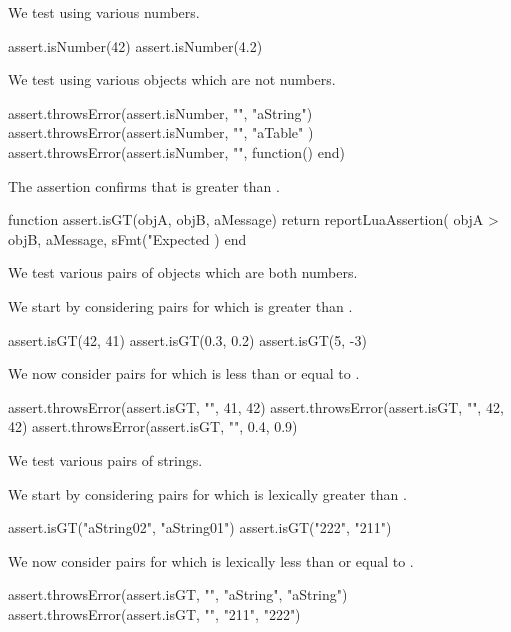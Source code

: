 
We test using various numbers.

\startLuaTest
  assert.isNumber(42)
  assert.isNumber(4.2)
\stopLuaTest
\stopTestCase


We test using various objects which are not numbers. 

\startLuaTest
  assert.throwsError(assert.isNumber, "", "aString")
  assert.throwsError(assert.isNumber, "", { "aTable" })
  assert.throwsError(assert.isNumber, "", function() end)
\stopLuaTest
\stopTestCase

\stopTestSuite


The  assertion confirms that  is greater than 
. 

\startLuaCode
function assert.isGT(objA, objB, aMessage)
  return reportLuaAssertion(
    objA > objB,
    aMessage,
    sFmt("Expected %
  )
end
\stopLuaCode


We test various pairs of objects which are both numbers.

We start by considering pairs for which  is greater than 
. 

\startLuaTest
  assert.isGT(42, 41)
  assert.isGT(0.3, 0.2)
  assert.isGT(5, -3)
\stopLuaTest

We now consider pairs for which  is less than or equal to 
. 

\startLuaTest
  assert.throwsError(assert.isGT, "", 41, 42)
  assert.throwsError(assert.isGT, "", 42, 42)
  assert.throwsError(assert.isGT, "", 0.4, 0.9)
\stopLuaTest
\stopTestCase


We test various pairs of strings.

We start by considering pairs for which  is lexically greater 
than . 

\startLuaTest
  assert.isGT("aString02", "aString01")
  assert.isGT("222", "211")
\stopLuaTest

We now consider pairs for which  is lexically less than or 
equal to . 

\startLuaTest
  assert.throwsError(assert.isGT, "", "aString", "aString")
  assert.throwsError(assert.isGT, "", "211", "222")
\stopLuaTest
\stopTestCase

